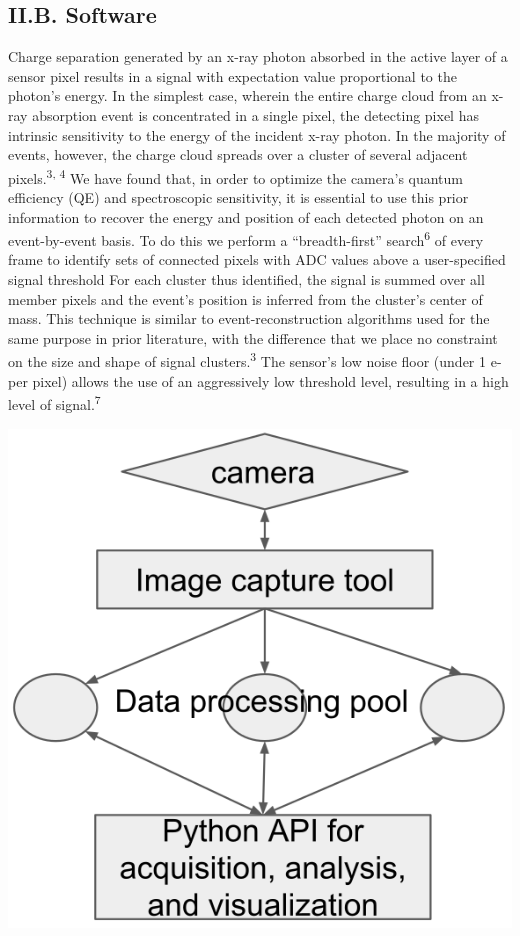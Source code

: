\FloatBarrier

\subsection{II.B. Software}

Charge separation generated by an x-ray photon absorbed in the active
layer of a sensor pixel results in a signal with expectation value
proportional to the photon's energy. In the simplest case, wherein the
entire charge cloud from an x-ray absorption event is concentrated in a
single pixel, the detecting pixel has intrinsic sensitivity to the
energy of the incident x-ray photon. In the majority of events, however,
the charge cloud spreads over a cluster of several adjacent
pixels.\textsuperscript{3, 4} We have found that, in order to optimize
the camera's quantum efficiency (QE) and spectroscopic sensitivity, it
is essential to use this prior information to recover the energy and
position of each detected photon on an event-by-event basis. To do this
we perform a ``breadth-first'' search\textsuperscript{6} of every frame
to identify sets of connected pixels with ADC values above a
user-specified signal threshold For each cluster thus identified, the
signal is summed over all member pixels and the event's position is
inferred from the cluster's center of mass. This technique is similar to
event-reconstruction algorithms used for the same purpose in prior
literature, with the difference that we place no constraint on the size
and shape of signal clusters.\textsuperscript{3} The sensor's low noise
floor (under 1 e- per pixel) allows the use of an aggressively low
threshold level, resulting in a high level of signal.\textsuperscript{7}

\begin{center}
\includegraphics[scale=0.5]{NewCameraPaper_1.10.docx1502867018/media/image2.png}
\end{center}

